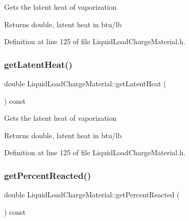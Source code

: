 Gets the latent heat of vaporization \begin{DoxyReturn}{Returns}
double, latent heat in btu/lb 
\end{DoxyReturn}


Definition at line 125 of file Liquid\+Load\+Charge\+Material.\+h.

\mbox{\label{class_liquid_load_charge_material_aca3a38eb3343144042e9349b053da1bc}} 
\subsubsection{\texorpdfstring{get\+Latent\+Heat()}{getLatentHeat()}\hspace{0.1cm}{\footnotesize\ttfamily [3/3]}}
{\footnotesize\ttfamily double Liquid\+Load\+Charge\+Material\+::get\+Latent\+Heat (\begin{DoxyParamCaption}{ }\end{DoxyParamCaption}) const\hspace{0.3cm}{\ttfamily [inline]}}

Gets the latent heat of vaporization \begin{DoxyReturn}{Returns}
double, latent heat in btu/lb 
\end{DoxyReturn}


Definition at line 125 of file Liquid\+Load\+Charge\+Material.\+h.

\mbox{\label{class_liquid_load_charge_material_acfedb26800cbead9bf11c57e1356dd57}} 
\subsubsection{\texorpdfstring{get\+Percent\+Reacted()}{getPercentReacted()}\hspace{0.1cm}{\footnotesize\ttfamily [1/3]}}
{\footnotesize\ttfamily double Liquid\+Load\+Charge\+Material\+::get\+Percent\+Reacted (\begin{DoxyParamCaption}{ }\end{DoxyParamCaption}) const\hspace{0.3cm}{\ttfamily [inline]}}

